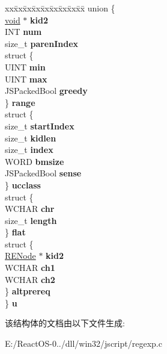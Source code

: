 \begin{DoxyCompactItemize}
\begin{tabbing}
\end{tabbing}\item 
\mbox{\label{struct_r_e_node_a5312507b4cec0470aa4db68a7e320e35}} 
\begin{tabbing}
xx\=xx\=xx\=xx\=xx\=xx\=xx\=xx\=xx\=\kill
union \{\\
\>\hyperlink{interfacevoid}{void} $\ast$ {\bfseries kid2}\\
\>INT {\bfseries num}\\
\>size\_t {\bfseries parenIndex}\\
\>struct \{\\
\>\>UINT {\bfseries min}\\
\>\>UINT {\bfseries max}\\
\>\>JSPackedBool {\bfseries greedy}\\
\>\} {\bfseries range}\\
\>struct \{\\
\>\>size\_t {\bfseries startIndex}\\
\>\>size\_t {\bfseries kidlen}\\
\>\>size\_t {\bfseries index}\\
\>\>WORD {\bfseries bmsize}\\
\>\>JSPackedBool {\bfseries sense}\\
\>\} {\bfseries ucclass}\\
\>struct \{\\
\>\>WCHAR {\bfseries chr}\\
\>\>size\_t {\bfseries length}\\
\>\} {\bfseries flat}\\
\>struct \{\\
\>\>\hyperlink{struct_r_e_node}{RENode} $\ast$ {\bfseries kid2}\\
\>\>WCHAR {\bfseries ch1}\\
\>\>WCHAR {\bfseries ch2}\\
\>\} {\bfseries altprereq}\\
\} {\bfseries u}\\

\end{tabbing}\end{DoxyCompactItemize}


该结构体的文档由以下文件生成\+:\begin{DoxyCompactItemize}
\item 
E\+:/\+React\+O\+S-\/0../dll/win32/jscript/regexp.\+c\end{DoxyCompactItemize}
